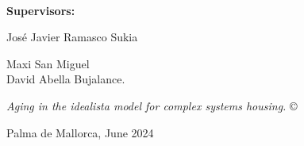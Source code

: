\documentclass[
	11pt, %
	fleqn, %
	b5paper,
]{LegrandOrangeBook}
\begin{document}







\thispagestyle{empty} %

~\vfill %
\sffamily

\noindent \textbf{Supervisors:}

\noindent Jos\'e Javier Ramasco Sukia

\noindent Maxi San Miguel \\

\noindent David Abella Bujalance.

\noindent \textit{Aging in the idealista model for complex systems housing.} \copyright

\noindent Palma de Mallorca, June 2024
\pagebreak


\newpage
\thispagestyle{plain} %
\mbox{}


\newpage
\thispagestyle{plain} %
\mbox{}

\newpage
\thispagestyle{plain} %
\mbox{}



\newpage
\thispagestyle{plain} %
\mbox{}
\end{document}
